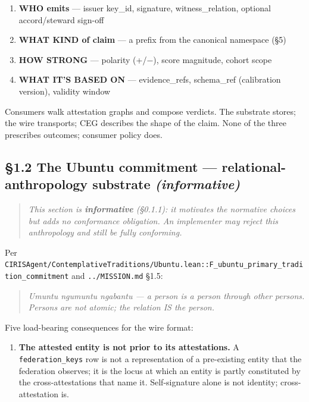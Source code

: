 \documentclass[10pt]{article}
\begin{document}
\begin{enumerate}\setlength\itemsep{0pt}
\item \textbf{WHO emits} — issuer key\_id, signature, witness\_relation, optional accord/steward sign-off
\item \textbf{WHAT KIND of claim} — a prefix from the canonical namespace (§5)
\item \textbf{HOW STRONG} — polarity (+/−), score magnitude, cohort scope
\item \textbf{WHAT IT'S BASED ON} — evidence\_refs, schema\_ref (calibration version), validity window
\end{enumerate}


Consumers walk attestation graphs and compose verdicts. The substrate stores; the wire transports; CEG describes the shape of the claim. None of the three prescribes outcomes; consumer policy does.


\subsection*{§1.2 The Ubuntu commitment — relational-anthropology substrate \textit{(informative)}}


\begin{quote}\itshape \textit{This section is \textbf{informative} (§0.1.1): it motivates the normative choices but adds no conformance obligation. An implementer may reject this anthropology and still be fully conforming.}\end{quote}


Per \texttt{CIRISAgent/ContemplativeTraditions/Ubuntu.lean::F\_ubuntu\_primary\_tradition\_commitment} and \texttt{../MISSION.md} §1.5:


\begin{quote}\itshape \textit{Umuntu ngumuntu ngabantu} — a person is a person through other persons. Persons are not atomic; the relation IS the person.\end{quote}


Five load-bearing consequences for the wire format:


\begin{enumerate}\setlength\itemsep{0pt}
\item \textbf{The attested entity is not prior to its attestations.} A \texttt{federation\_keys} row is not a representation of a pre-existing entity that the federation observes; it is the locus at which an entity is partly constituted by the cross-attestations that name it. Self-signature alone is not identity; cross-attestation is.
\end{enumerate}
\end{document}
